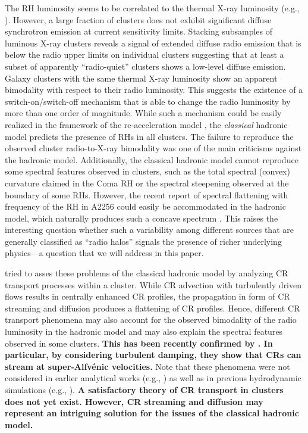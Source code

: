 \documentclass[useAMS,usenatbib]{mn2e}
\begin{document}
The RH luminosity seems to be correlated to the thermal X-ray luminosity (e.g.,
\citealp{2009A&A...507..661B,2011A&A...527A..99E}). However, a large fraction of
clusters does not exhibit significant diffuse synchrotron emission at current
sensitivity limits. Stacking subsamples of luminous X-ray clusters reveals a
signal of extended diffuse radio emission that is below the radio upper limits
on individual clusters \citep{2011ApJ...740L..28B} suggesting that at least a
subset of apparently ``radio-quiet'' clusters shows a low-level diffuse
emission. Galaxy clusters with the same thermal X-ray luminosity show an
apparent bimodality with respect to their radio luminosity.  This suggests the
existence of a switch-on/switch-off mechanism that is able to change the radio
luminosity by more than one order of magnitude.  While such a mechanism could be
easily realized in the framework of the re-acceleration model
\citep{2009A&A...507..661B}, the \emph{classical} hadronic model predicts the
presence of RHs in all clusters. The failure to reproduce the observed cluster
radio-to-X-ray bimodality was one of the main criticisms against the hadronic
model.  Additionally, the classical hadronic model cannot reproduce some
spectral features observed in clusters, such as the total spectral (convex)
curvature claimed in the Coma RH or the spectral steepening observed at the
boundary of some RHs.  However, the recent report of spectral flattening with
frequency of the RH in A2256 \citep{2012A&A...543A..43V} could easily be
accommodated in the hadronic model, which naturally produces such a concave
spectrum \citep{2010MNRAS.409..449P}.  This raises the interesting question
whether such a variability among different sources that are generally classified
as ``radio halos'' signals the presence of richer underlying physics---a question
that we will address in this paper.

\cite{2011A&A...527A..99E} tried to asses these problems of the classical
hadronic model by analyzing CR transport processes within a cluster. While CR
advection with turbulently driven flows results in centrally enhanced CR
profiles, the propagation in form of CR streaming and diffusion produces a
flattening of CR profiles. Hence, different CR transport phenomena may also
account for the observed bimodality of the radio luminosity in the hadronic
model and may also explain the spectral features observed in some clusters. {\bf
  This has been recently confirmed by \cite{2013arXiv1303.4746W}. In particular,
  by considering turbulent damping, they show that CRs can stream at
  super-Alfv{\'e}nic velocities.}  Note that these phenomena were not considered in
earlier analytical works (e.g., \citealp{2004A&A...413...17P}) as well as in
previous hydrodynamic simulations (e.g., \citealp{2001ApJ...562..233M,
  2008MNRAS.385.1211P, 2010MNRAS.409..449P}).  {\bf A satisfactory theory of CR
  transport in clusters does not yet exist. However, CR streaming and diffusion
  may represent an intriguing solution for the issues of the classical hadronic
  model.}
\end{document}
